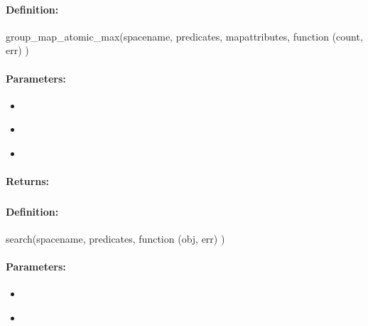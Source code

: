 \paragraph{Definition:}
\begin{javascriptcode}
group_map_atomic_max(spacename, predicates, mapattributes, function (count, err) {})
\end{javascriptcode}
\paragraph{Parameters:}
\begin{itemize}[noitemsep]
\item {}\\

\item {}\\

\item {}\\

\end{itemize}

\paragraph{Returns:}


\pagebreak
\subsubsection{}
\label{api:nodejs:search}


\paragraph{Definition:}
\begin{javascriptcode}
search(spacename, predicates, function (obj, err) {})
\end{javascriptcode}
\paragraph{Parameters:}
\begin{itemize}[noitemsep]
\item {}\\

\item {}\\

\end{itemize}

